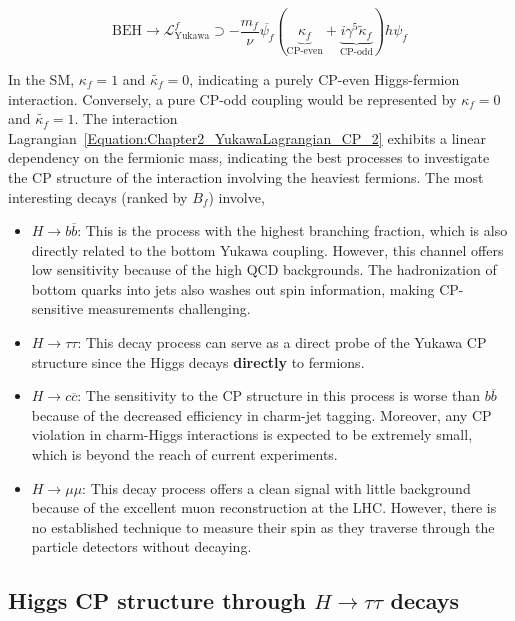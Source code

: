 \begin{equation}
    \text{BEH} \rightarrow \mathcal{L}_{\text{Yukawa}}^f \supset - \frac{m_f}{\nu}\overline{\psi_f} (\underbrace{\kappa_f}_{\text{CP-even}} + \underbrace{i\gamma^5\tilde{\kappa}_f}_{\text{CP-odd}})h\psi_f
\label{Equation:Chapter2_YukawaLagrangian_CP_2}
\end{equation}

In the SM, $\kappa_f = 1$ and $\tilde{\kappa_f} = 0$, indicating a purely CP-even Higgs-fermion interaction. Conversely, a pure CP-odd coupling would be represented by $\kappa_f = 0$ and $\tilde{\kappa_f} = 1$. The interaction Lagrangian~\ref{Equation:Chapter2_YukawaLagrangian_CP_2} exhibits a linear dependency on the fermionic mass, indicating the best processes to investigate the CP structure of the interaction involving the heaviest fermions. The most interesting decays (ranked by $B_f$) involve,

\begin{itemize}
    \item $H \to b\overline{b}$: This is the process with the highest branching fraction, which is also directly related to the bottom Yukawa coupling. However, this channel offers low sensitivity because of the high QCD backgrounds. The hadronization of bottom quarks into jets also washes out spin information, making CP-sensitive measurements challenging.

    \item $H \to \tau \tau$: This decay process can serve as a direct probe of the Yukawa CP structure since the Higgs decays \textbf{directly} to fermions. 

    \item $H \to c \overline{c}$: The sensitivity to the CP structure in this process is worse than $b\overline{b}$ because of the decreased efficiency in charm-jet tagging. Moreover, any CP violation in charm-Higgs interactions is expected to be extremely small, which is beyond the reach of current experiments.

    \item $H \to \mu \mu$: This decay process offers a clean signal with little background because of the excellent muon reconstruction at the LHC. However, there is no established technique to measure their spin as they traverse through the particle detectors without decaying. 
\end{itemize}

\subsection{Higgs CP structure through \texorpdfstring{$H\to\tau\tau$}{H→tautau} decays}


